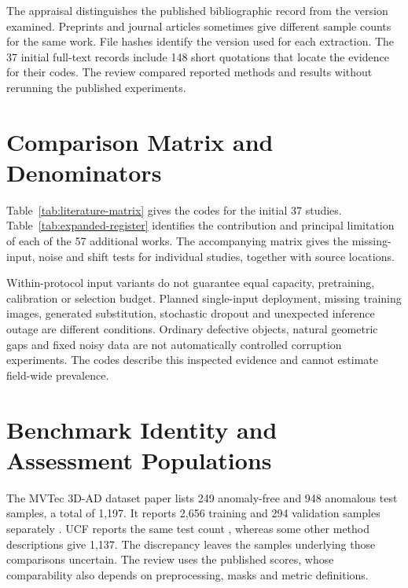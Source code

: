 The appraisal distinguishes the published bibliographic record from the version examined. Preprints and journal articles sometimes give different sample counts for the same work. File hashes identify the version used for each extraction. The 37 initial full-text records include 148 short quotations that locate the evidence for their codes. The review compared reported methods and results without rerunning the published experiments.

\section{Comparison Matrix and Denominators}
Table~\ref{tab:literature-matrix} gives the codes for the initial 37 studies. Table~\ref{tab:expanded-register} identifies the contribution and principal limitation of each of the 57 additional works. The accompanying matrix gives the missing-input, noise and shift tests for individual studies, together with source locations.

Within-protocol input variants do not guarantee equal capacity, pretraining, calibration or selection budget. Planned single-input deployment, missing training images, generated substitution, stochastic dropout and unexpected inference outage are different conditions. Ordinary defective objects, natural geometric gaps and fixed noisy data are not automatically controlled corruption experiments. The codes describe this inspected evidence and cannot estimate field-wide prevalence.





\section{Benchmark Identity and Assessment Populations}
The MVTec 3D-AD dataset paper lists 249 anomaly-free and 948 anomalous test samples, a total of 1,197. It reports 2,656 training and 294 validation samples separately \citep[Table~1, PDF p.~4]{Bergmann2022The}. UCF reports the same test count \citep{Cheng2025Multimodal}, whereas some other method descriptions give 1,137. The discrepancy leaves the samples underlying those comparisons uncertain. The review uses the published scores, whose comparability also depends on preprocessing, masks and metric definitions.

